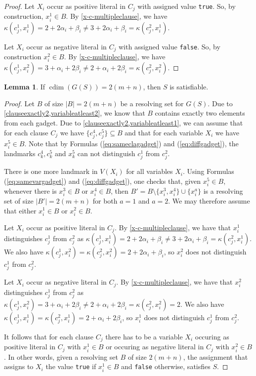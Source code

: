 \documentclass[letterpaper,12pt,headings=normal,parskip=half]{scrartcl}
\DeclareMathOperator{\cdim}{cdim}
\theoremstyle{definition}
\newtheorem{lemma}[theorem]{Lemma}
\begin{document}
\begin{proof}
    Let $X_i$ occur as positive literal in $C_j$ with assigned value \texttt{true}. 
    So, by construction, $x_i^1\in B$.
    By \cref{x-c-multipleclause}, we have $\kappa(c_j^1,x_i^1)=2+2\alpha_i+\beta_i\neq3+2\alpha_i+\beta_i=\kappa(c_j^2,x_i^1)$.

    Let $X_i$ occur as negative literal in $C_j$ with assigned value \texttt{false}. 
    So, by construction $x_i^2\in B$. 
    By \cref{x-c-multipleclause}, we have $\kappa(c_j^1,x_i^2)=3+\alpha_i+2\beta_i\neq2+\alpha_i+2\beta_i=\kappa(c_j^2,x_i^2)$.
\end{proof}

\begin{lemma}\label{cdimifsatisfiable}
    If $\cdim(G(S))=2(m+n)$, then $S$ is satisfiable.
\end{lemma}

\begin{proof}
    Let $B$ of size $|B|=2(m+n)$ be a resolving set for $G(S)$. 
    Due to \cref{clauseexactly2,variableatleast2}, we know that $B$ contains exactly two elements from each gadget. 
    Due to \cref{clauseexactly2,variableatleast1}, we can assume that for each clause $C_j$ we have $\{c_j^4,c_j^5\}\subseteq B$ and that for each variable $X_i$ we have $x_i^5\in B$.
    Note that by Formulas (\ref{eq:sameclagadget}) and (\ref{eq:diffgadget}), the landmarks $c_k^4,c_k^5$ and $x_k^5$ can not distinguish $c_j^1$ from $c_j^2$.
    
    There is one more landmark in $V(X_i)$ for all variables $X_i$.
    Using Formulas (\ref{eq:samevargadget}) and (\ref{eq:diffgadget}), one checks that, given $x_i^5\in B$, whenever there is $x_i^3\in B$ or $x_i^4\in B$, then $B'=B\setminus\{x_i^3,x_i^4\}\cup\{x_i^a\}$ is a resolving set of size $|B'|=2(m+n)$ for both $a=1$ and $a=2$.
    We may therefore assume that either $x_i^1\in B$ or $x_i^2\in B$.
    
    Let $X_i$ occur as positive literal in $C_j$. 
    By \cref{x-c-multipleclause}, we have that $x_i^1$ distinguishes $c_j^1$ from $c_j^2$ as $\kappa(c_j^1,x_i^1)=2+2\alpha_i+\beta_i\neq3+2\alpha_i+\beta_i=\kappa(c_j^2,x_i^1)$. 
    We also have $\kappa(c_j^1,x_i^2)=\kappa(c_j^2,x_i^2)=2+2\alpha_i+\beta_i$, so $x_i^2$ does not distinguish $c_j^1$ from $c_j^2$.

    Let $X_i$ occur as negative literal in $C_j$. 
    By \cref{x-c-multipleclause}, we have that $x_i^2$ distinguishes $c_j^1$ from $c_j^2$ as $\kappa(c_j^1,x_i^2)=3+\alpha_i+2\beta_i\neq2+\alpha_i+2\beta_i=\kappa(c_j^2,x_i^2)=2$. 
    We also have $\kappa(c_j^1,x_i^1)=\kappa(c_j^2,x_i^1)=2+\alpha_i+2\beta_i$, so $x_i^1$ does not distinguish $c_j^1$ from $c_j^2$.

 It follows that for each clause $C_j$ there has to be a variable $X_i$ occuring as positive literal in $C_j$ with $x_i^1\in B$ or occuring as negative literal in $C_j$ with $x_i^2\in B$. 
    In other words, given a resolving set $B$ of size $2(m+n)$, the assignment that assigns to $X_i$ the value \texttt{true} if $x_i^1\in B$ and \texttt{false} otherwise, satisfies $S$.
\end{proof}
\end{document}
